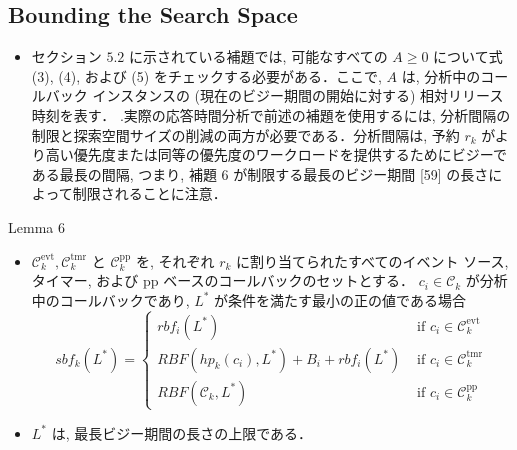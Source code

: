 \subsection{Bounding the Search Space}
\label{ssec: bounding the search space}

\begin{frame}{}
    \begin{itemize}
        \item セクション $5.2$ に示されている補題では, 可能なすべての $A \geq 0$ について式 (3), (4), および (5) をチェックする必要がある．ここで, $A$ は, 分析中のコールバック インスタンスの (現在のビジー期間の開始に対する) 相対リリース時刻を表す． .実際の応答時間分析で前述の補題を使用するには, 分析間隔の制限と探索空間サイズの削減の両方が必要である．分析間隔は, 予約 $r_{k}$ がより高い優先度または同等の優先度のワークロードを提供するためにビジーである最長の間隔, つまり, 補題 6 が制限する最長のビジー期間 [59] の長さによって制限されることに注意．
    \end{itemize}
\end{frame}

\begin{frame}[label=lemma6]{Lemma 6}
    \begin{lemma}[]
        \begin{itemize}
            \item $\mathcal{C}_{k}^{\mathrm{evt}}, \mathcal{C}_{k}^{\mathrm{tmr}}$ と $\mathcal{C}_{k}^{\mathrm{pp}}$ を, それぞれ $r_{k}$ に割り当てられたすべてのイベント ソース, タイマー, および pp ベースのコールバックのセットとする． $c_{i} \in \mathcal{C}_{k}$ が分析中のコールバックであり, $L^{*}$ が条件を満たす最小の正の値である場合
                  \begin{equation*}
                      s b f_{k}\left(L^{*}\right)= \begin{cases}r b f_{i}\left(L^{*}\right) & \text { if } c_{i} \in \mathcal{C}_{k}^{\mathrm{evt}} \\ R B F\left(h p_{k}\left(c_{i}\right), L^{*}\right)+B_{i}+r b f_{i}\left(L^{*}\right) & \text { if } c_{i} \in \mathcal{C}_{k}^{\mathrm{tmr}} \\ R B F\left(\mathcal{C}_{k}, L^{*}\right) & \text { if } c_{i} \in \mathcal{C}_{k}^{\mathrm{pp}}\end{cases}
                  \end{equation*}

            \item $L^{*}$ は, 最長ビジー期間の長さの上限である．
        \end{itemize}
    \end{lemma}
\end{frame}

